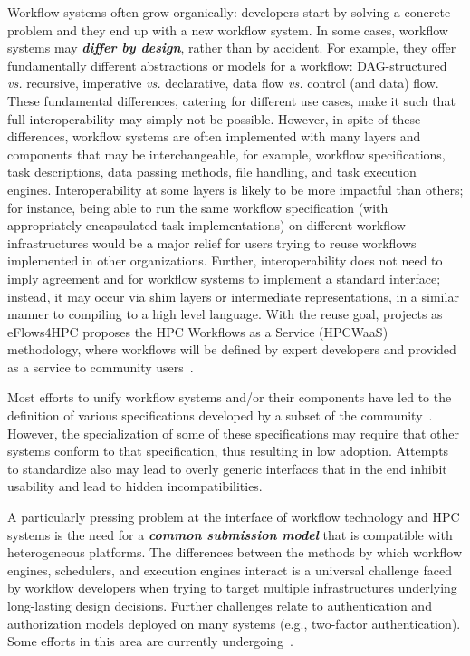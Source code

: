 Workflow systems often grow organically: developers start by solving a concrete problem and they end up with a new workflow system. In some cases, workflow systems may \textbf{\emph{differ by design}}, rather than by accident. For example, they offer fundamentally different abstractions or models for a workflow: DAG-structured \emph{vs.} recursive, imperative \emph{vs.} declarative, data flow \emph{vs.} control (and data) flow. These fundamental differences, catering for different use cases, make it such that full interoperability may simply not be possible. 
However, in spite of these differences, workflow systems are often implemented with many layers and components that may be interchangeable, for example, workflow specifications, task descriptions, data passing methods, file handling, and task execution engines. Interoperability at some layers is likely to be more impactful than others; for instance, being able to run the same workflow specification (with appropriately encapsulated task implementations) on different workflow infrastructures would be a major relief for users trying to reuse workflows implemented in other organizations. Further, interoperability does not need to imply agreement and for workflow systems to implement a standard interface; instead, it may occur via shim layers or intermediate representations, in a similar manner to compiling to a high level language. With the reuse goal, projects as eFlows4HPC proposes the HPC Workflows as a Service (HPCWaaS) methodology, where workflows will be defined by expert developers and provided as a service to community users~\cite{eflows}.

Most efforts to unify workflow systems and/or their components have led to the definition of various specifications developed by a subset of the community~\cite{terstyanszky2014enabling, cwl-annotations}. However, the specialization of some of these specifications may require that other systems conform to that specification, thus resulting in low adoption. Attempts to standardize also may lead to overly generic interfaces that in the end inhibit usability and lead to hidden incompatibilities. 

A particularly pressing problem at the interface of workflow technology and HPC systems is the need for a \textbf{\emph{common submission model}} that is compatible with heterogeneous platforms. The differences between the methods by which workflow engines, schedulers, and execution engines interact is a universal challenge faced by workflow developers when trying to target multiple infrastructures underlying long-lasting design decisions. Further challenges relate to authentication and authorization models deployed on many systems (e.g., two-factor authentication). Some efforts in this area are currently undergoing~\cite{JLESC-common-registry}.


